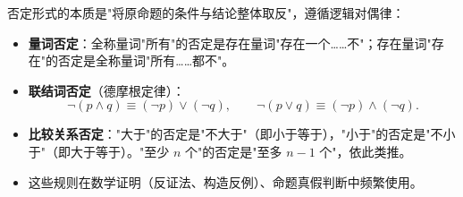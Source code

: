 \begin{explanationbox}
否定形式的本质是"将原命题的条件与结论整体取反"，遵循逻辑对偶律：
\begin{itemize}
    \item \textbf{量词否定}：全称量词"所有"的否定是存在量词"存在一个……不"；存在量词"存在"的否定是全称量词"所有……都不"。
    \item \textbf{联结词否定}（德摩根定律）：
        \[
        \lnot(p\land q) \equiv (\lnot p)\lor(\lnot q),\qquad \lnot(p\lor q) \equiv (\lnot p)\land(\lnot q).
        \]
    \item \textbf{比较关系否定}："大于"的否定是"不大于"（即小于等于），"小于"的否定是"不小于"（即大于等于）。"至少 $n$ 个"的否定是"至多 $n-1$ 个"，依此类推。
    \item 这些规则在数学证明（反证法、构造反例）、命题真假判断中频繁使用。
\end{itemize}
\end{explanationbox}